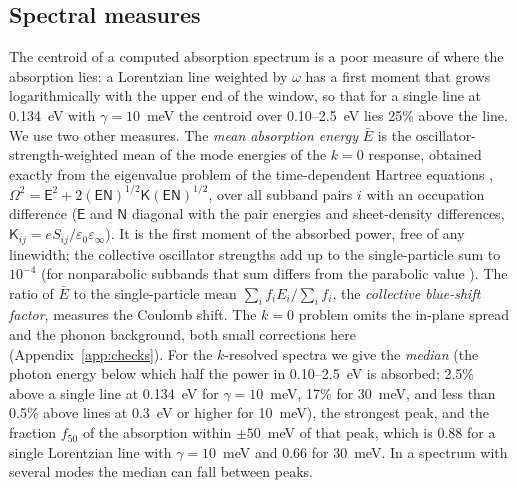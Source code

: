 \documentclass[11pt]{article}
\begin{document}
\subsection{Spectral measures}\label{sec:measures}
The centroid of a computed absorption spectrum is a poor measure of where the absorption lies: a Lorentzian line weighted by $\omega$ has a first moment that grows logarithmically with the upper end of the window, so that for a single line at 0.134~eV with $\gamma=10$~meV the centroid over 0.10--2.5~eV lies 25\% above the line. We use two other measures. The \emph{mean absorption energy} $\bar E$ is the oscillator-strength-weighted mean of the mode energies of the $k=0$ response, obtained exactly from the eigenvalue problem of the time-dependent Hartree equations \cite{AllenTsuiVinter1976,AndoRMP1982}, $\Omega^2=\mathsf E^2+2(\mathsf{EN})^{1/2}\mathsf K(\mathsf{EN})^{1/2}$, over all subband pairs $i$ with an occupation difference ($\mathsf E$ and $\mathsf N$ diagonal with the pair energies and sheet-density differences, $\mathsf K_{ij}=eS_{ij}/\varepsilon_0\varepsilon_\infty$). It is the first moment of the absorbed power, free of any linewidth; the collective oscillator strengths add up to the single-particle sum to $10^{-4}$ (for nonparabolic subbands that sum differs from the parabolic value \cite{Sirtori1994}). The ratio of $\bar E$ to the single-particle mean $\sum_if_iE_i/\sum_if_i$, the \emph{collective blue-shift factor}, measures the Coulomb shift. The $k=0$ problem omits the in-plane spread and the phonon background, both small corrections here (Appendix~\ref{app:checks}). For the $k$-resolved spectra we give the \emph{median} (the photon energy below which half the power in 0.10--2.5~eV is absorbed; 2.5\% above a single line at 0.134~eV for $\gamma=10$~meV, 17\% for 30~meV, and less than 0.5\% above lines at 0.3~eV or higher for 10~meV), the strongest peak, and the fraction $f_{50}$ of the absorption within $\pm50$~meV of that peak, which is 0.88 for a single Lorentzian line with $\gamma=10$~meV and 0.66 for 30~meV. In a spectrum with several modes the median can fall between peaks.
\end{document}
